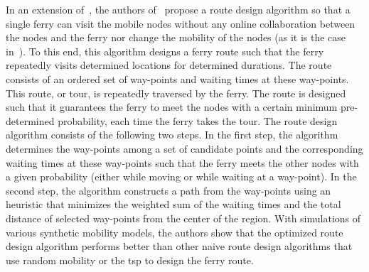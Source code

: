 In an extension of~\cite{zhao2003message}, the authors of~\cite{bin2006message} propose a route design algorithm so that a single ferry can visit the mobile nodes without any online collaboration between the nodes and the ferry nor change the mobility of the nodes (as it is the case in~\cite{zhao2003message,zhao2004message}). To this end, this algorithm designs a ferry route such that the ferry repeatedly visits determined locations for determined durations. The route consists of an ordered set of way-points and waiting times at these way-points. This route, or tour, is repeatedly traversed by the ferry. The route is designed such that it guarantees the ferry to meet the nodes with a certain minimum pre-determined probability, each time the ferry takes the tour. The route design algorithm consists of the following two steps. In the first step, the algorithm determines the way-points among a set of candidate points and the corresponding waiting times at these way-points such that the ferry meets the other nodes with a given probability (either while moving or while waiting at a way-point). In the second step, the algorithm constructs a path from the way-points using an heuristic that minimizes the weighted sum of the waiting times and the total distance of selected way-points from the center of the region. With simulations of various synthetic mobility models, the authors show that the optimized route design algorithm performs better than other naive route design algorithms that use random mobility or the \acrshort{tsp} to design the ferry route.

